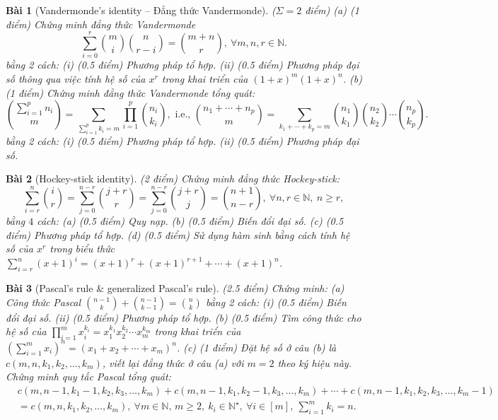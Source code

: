 \documentclass{article}
\newtheorem{baitoan}{Bài}
\begin{document}
\begin{baitoan}[Vandermonde's identity -- Đẳng thức Vandermonde]
    {\rm($\Sigma = 2$ điểm)} (a) {\rm(1 điểm)} Chứng minh đẳng thức Vandermonde
    \begin{equation*}
        \sum_{i=0}^r \binom{m}{i}\binom{n}{r - i} = \binom{m + n}{r},\ \forall m,n,r\in\mathbb{N}.
    \end{equation*}
    bằng 2 cách: (i) {\rm(0.5 điểm)} Phương pháp tổ hợp. (ii) {\rm(0.5 điểm)} Phương pháp đại số thông qua việc tính hệ số của $x^r$ trong khai triển của $(1 + x)^m(1 + x)^n$. (b) {\rm(1 điểm)} Chứng minh đẳng thức Vandermonde tổng quát:
    \begin{equation*}
        \binom{\sum_{i=1}^p n_i}{m} = \sum_{\sum_{i=1}^p k_i = m} \prod_{i=1}^p \binom{n_i}{k_i},\mbox{ i.e., }\binom{n_1 + \cdots + n_p}{m} = \sum_{k_1 + \cdots + k_p = m} \binom{n_1}{k_1}\binom{n_2}{k_2}\cdots\binom{n_p}{k_p}.
    \end{equation*}
    bằng 2 cách: (i) {\rm(0.5 điểm)} Phương pháp tổ hợp. (ii) {\rm(0.5 điểm)} Phương pháp đại số.
\end{baitoan}

\begin{baitoan}[Hockey-stick identity]
    {\rm(2 điểm)} Chứng minh đẳng thức Hockey-stick:
    \begin{equation*}
        \sum_{i=r}^n \binom{i}{r} = \sum_{j=0}^{n - r} \binom{j + r}{r} = \sum_{j=0}^{n - r} \binom{j + r}{j} = \binom{n + 1}{n - r},\ \forall n,r\in\mathbb{N},\ n\ge r,
    \end{equation*}
    bằng $4$ cách: (a) {\rm(0.5 điểm)} Quy nạp. (b) {\rm(0.5 điểm)} Biến đổi đại số. (c) {\rm(0.5 điểm)} Phương pháp tổ hợp. (d) {\rm(0.5 điểm)} Sử dụng hàm sinh bằng cách tính hệ số của $x^r$ trong biểu thức $\sum_{i=r}^n (x + 1)^i = (x + 1)^r + (x + 1)^{r + 1} + \cdots + (x + 1)^n$.
\end{baitoan}

\begin{baitoan}[Pascal's rule \& generalized Pascal's rule]
    {\rm(2.5 điểm)} Chứng minh: (a) Công thức Pascal $\binom{n - 1}{k} + \binom{n - 1}{k - 1} = \binom{n}{k}$ bằng 2 cách: (i) {\rm(0.5 điểm)} Biến đổi đại số. (ii) {\rm(0.5 điểm)} Phương pháp tổ hợp. (b) {\rm(0.5 điểm)} Tìm công thức cho hệ số của $\prod_{i=1}^m x_i^{k_i} = x_1^{k_1}x_2^{k_2}\cdots x_m^{k_m}$ trong khai triển của $\left(\sum_{i=1}^m x_i\right)^n = (x_1 + x_2 + \cdots + x_m)^n$. (c) {\rm(1 điểm)} Đặt hệ số ở câu (b) là $c(m,n,k_1,k_2,\ldots,k_m)$, viết lại đẳng thức ở câu (a) với $m = 2$ theo ký hiệu này. Chứng minh quy tắc Pascal tổng quát:
    \begin{align*}
        &c(m,n - 1,k_1 - 1,k_2,k_3,\ldots,k_m) + c(m,n - 1,k_1,k_2 - 1,k_3,\ldots,k_m) + \cdots + c(m,n - 1,k_1,k_2,k_3,\ldots,k_m - 1)\\
        &= c(m,n,k_1,k_2,\ldots,k_m),\ \forall m\in\mathbb{N},\,m\ge2,\ k_i\in\mathbb{N}^\star,\ \forall i\in[m],\ \sum_{i=1}^m k_i = n.
    \end{align*}
\end{baitoan}
\end{document}
